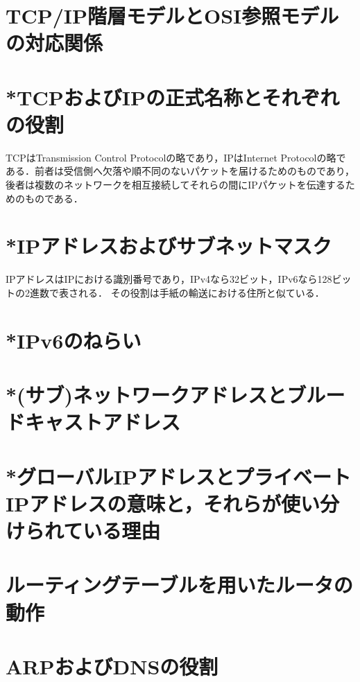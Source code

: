 \documentclass[10.5pt]{jsarticle}
\begin{document}
\section{TCP/IP階層モデルとOSI参照モデルの対応関係}



\section{*TCPおよびIPの正式名称とそれぞれの役割}
TCPはTransmission Control Protocolの略であり，IPはInternet Protocolの略である．前者は受信側へ欠落や順不同のないパケットを届けるためのものであり，
後者は複数のネットワークを相互接続してそれらの間にIPパケットを伝達するためのものである．


\section{*IPアドレスおよびサブネットマスク}
IPアドレスはIPにおける識別番号であり，IPv4なら32ビット，IPv6なら128ビットの2進数で表される．
その役割は手紙の輸送における住所と似ている．


\section{*IPv6のねらい}



\section{*(サブ)ネットワークアドレスとブルードキャストアドレス}



\section{*グローバルIPアドレスとプライベートIPアドレスの意味と，それらが使い分けられている理由}



\section{ルーティングテーブルを用いたルータの動作}



\section{ARPおよびDNSの役割}
\end{document}
